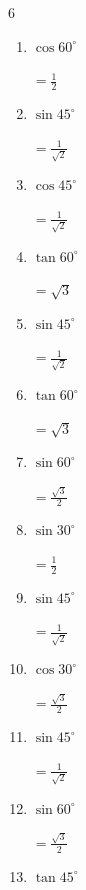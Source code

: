 \begin{multicols}{6}
\begin{enumerate}
        $\displaystyle =\frac{1}{2}$

  \item $\displaystyle \cos{60^\circ}$

        $\displaystyle =\frac{1}{2}$

  \item $\displaystyle \sin{45^\circ}$

        $\displaystyle =\frac{1}{\sqrt{2}}$

  \item $\displaystyle \cos{45^\circ}$

        $\displaystyle =\frac{1}{\sqrt{2}}$

  \item $\displaystyle \tan{60^\circ}$

        $\displaystyle =\sqrt{3}$

  \item $\displaystyle \sin{45^\circ}$

        $\displaystyle =\frac{1}{\sqrt{2}}$

  \item $\displaystyle \tan{60^\circ}$

        $\displaystyle =\sqrt{3}$

  \item $\displaystyle \sin{60^\circ}$

        $\displaystyle =\frac{\sqrt{3}}{2}$

  \item $\displaystyle \sin{30^\circ}$

        $\displaystyle =\frac{1}{2}$

  \item $\displaystyle \sin{45^\circ}$

        $\displaystyle =\frac{1}{\sqrt{2}}$

  \item $\displaystyle \cos{30^\circ}$

        $\displaystyle =\frac{\sqrt{3}}{2}$

\columnbreak %

  \item $\displaystyle \sin{45^\circ}$

        $\displaystyle =\frac{1}{\sqrt{2}}$

  \item $\displaystyle \sin{60^\circ}$

        $\displaystyle =\frac{\sqrt{3}}{2}$

  \item $\displaystyle \tan{45^\circ}$


\end{enumerate}
\end{multicols}
